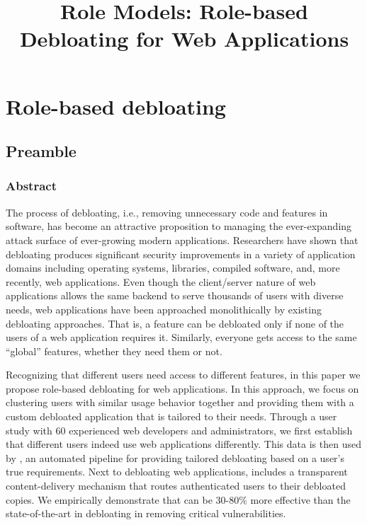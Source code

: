 \chapter{Role-based debloating}
\section*{Preamble}

\title*{Role Models: Role-based Debloating for Web Applications}

\subsection*{Abstract}
The process of debloating, i.e., removing unnecessary code and features in software, has become an attractive proposition to managing the ever-expanding attack surface of ever-growing modern applications. Researchers have shown that debloating produces significant security improvements in a variety of application domains including operating systems, libraries, compiled software, and, more recently, web applications. Even though the client/server nature of web applications allows the same backend to serve thousands of users with diverse needs, web applications have been approached monolithically by existing debloating approaches. That is, a feature can be debloated only if none of the users of a web application requires it. Similarly, everyone gets access to the same ``global'' features, whether they need them or not.

Recognizing that different users need access to different features, in this paper we propose role-based debloating for web applications. In this approach, we focus on clustering users with similar usage behavior together and providing them with a custom debloated application that is tailored to their needs. Through a user study with 60 experienced web developers and administrators, we first establish that different users indeed use web applications differently. This data is then used by \sys{}, an automated pipeline for providing tailored debloating based on a user's true requirements. Next to debloating web applications, \sys{} includes a transparent content-delivery mechanism that routes authenticated users to their debloated copies. 
We empirically demonstrate that \sys{} can be 30-80\% more effective than the state-of-the-art in debloating in removing critical vulnerabilities. 









%


